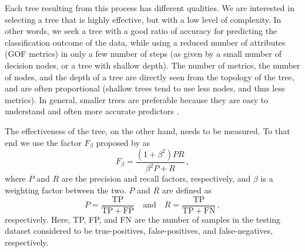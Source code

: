 Each tree resulting from this process has different qualities. We are interested in selecting a tree that is highly effective, but with a low level of complexity. In other words, we seek a tree with a good ratio of accuracy for predicting the classification outcome of the data, while using a reduced number of attributes (GOF metrics) in only a few number of steps (as given by a small number of decision nodes, or a tree with shallow depth). The number of metrics, the number of nodes, and the depth of a tree are directly seen from the topology of the tree, and are often proportional (shallow trees tend to use less nodes, and thus less metrics). In general, smaller trees are preferable because they are easy to understand and often more accurate predictors \citep{Quinlan_1996_JAIR}.

The effectiveness of the tree, on the other hand, needs to be measured. To that end we use the factor $F_{\beta}$ proposed by \citet{Rijsbergen_1979_Book} as
%
\begin{equation}
	\label{eq:f}
	F_{\beta} = \frac{ (1 + \beta^2) P R}{\beta^2 P + R}
	\, ,
\end{equation}
%
where $P$ and $R$ are the precision and recall factors, respectively, and $\beta$ is a weighting factor between the two. $P$ and $R$ are defined as
%
\begin{equation}
	P = \frac{ \mathrm{TP} }{ \mathrm{TP} + \mathrm{FP} }
	\quad \mathrm{and} \quad
	R = \frac{ \mathrm{TP} }{ \mathrm{TP} + \mathrm{FN} }
	\, ,
\end{equation}
%
respectively. Here, TP, FP, and FN are the number of samples in the testing dataset considered to be true-positives, false-positives, and false-negatives, respectively.

